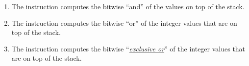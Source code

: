 \begin{enumerate}
      Again, it is important to note that the \textsl{Java} implementation of $a \;\texttt{\%}\; b$
      differs from the implementation in \textsl{Python}.  For example, in \textsl{Java} we have
      $-5 \,\mathtt{\%}\, 3 = -2$,
      while we have $-5 \,\mathtt{\%}\, 3 = 1$
      in \textsl{Python}.
\item The instruction 
      computes the bitwise ``and'' of the values on top of the stack.
\item The instruction 
      computes the bitwise ``or'' of the integer values that are on top of the stack.
\item The instruction 
      computes the bitwise ``\href{http://en.wikipedia.org/wiki/Exclusive_or}{\emph{exclusive or}}'' of
      the integer values that are on top of the stack. 
\end{enumerate}

